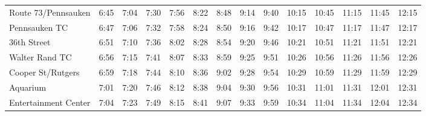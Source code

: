 \begin{center}
\begin{tabular}{@{}lrrrrrrrrrrrrr@{}}
Route 73/Pennsauken & 6:45 & 7:04 & 7:30 & 7:56 & 8:22 & 8:48 & 9:14 & 9:40 & 10:15 & 10:45 & 11:15 & 11:45 & 12:15 \\
Pennsauken TC & 6:47 & 7:06 & 7:32 & 7:58 & 8:24 & 8:50 & 9:16 & 9:42 & 10:17 & 10:47 & 11:17 & 11:47 & 12:17 \\
36th Street & 6:51 & 7:10 & 7:36 & 8:02 & 8:28 & 8:54 & 9:20 & 9:46 & 10:21 & 10:51 & 11:21 & 11:51 & 12:21 \\
Walter Rand TC & 6:56 & 7:15 & 7:41 & 8:07 & 8:33 & 8:59 & 9:25 & 9:51 & 10:26 & 10:56 & 11:26 & 11:56 & 12:26 \\
Cooper St/Rutgers & 6:59 & 7:18 & 7:44 & 8:10 & 8:36 & 9:02 & 9:28 & 9:54 & 10:29 & 10:59 & 11:29 & 11:59 & 12:29 \\
Aquarium & 7:01 & 7:20 & 7:46 & 8:12 & 8:38 & 9:04 & 9:30 & 9:56 & 10:31 & 11:01 & 11:31 & 12:01 & 12:31 \\
Entertainment Center & 7:04 & 7:23 & 7:49 & 8:15 & 8:41 & 9:07 & 9:33 & 9:59 & 10:34 & 11:04 & 11:34 & 12:04 & 12:34 \\
\bottomrule\end{tabular}\end{center}

